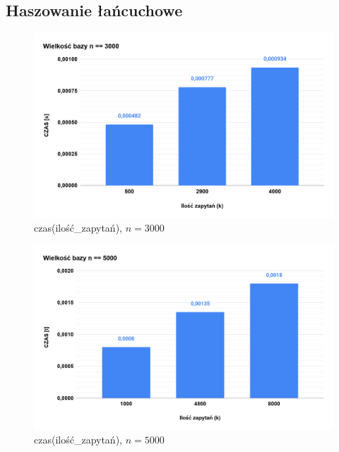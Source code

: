\documentclass{article}
\begin{document}
\newpage

\subsection{Haszowanie łańcuchowe}
\begin{figure}[H]
	\centering
	\includegraphics[scale=0.22]{ln3k.png}
	\caption{czas(ilość\_zapytań), $n = 3000$}
	\label{fig:ln3k}
\end{figure}

\begin{figure}[H]
	\centering
	\includegraphics[scale=0.22]{ln5k.png}
	\caption{czas(ilość\_zapytań), $n = 5000$}
	\label{fig:ln5k}
\end{figure}
\end{document}
